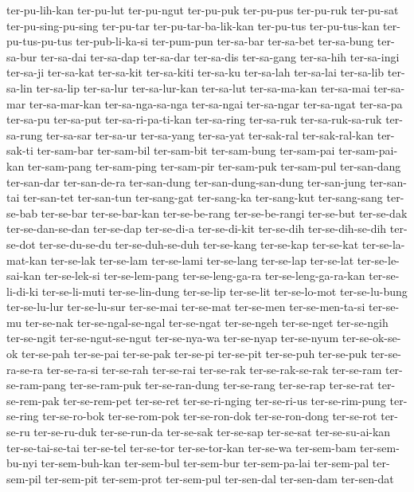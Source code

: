 {ter-pu-lih-kan ter-pu-lut ter-pu-ngut ter-pu-puk ter-pu-pus ter-pu-ruk
ter-pu-sat ter-pu-sing-pu-sing ter-pu-tar ter-pu-tar-ba-lik-kan ter-pu-tus
ter-pu-tus-kan ter-pu-tus-pu-tus ter-pub-li-ka-si ter-pum-pun ter-sa-bar
ter-sa-bet ter-sa-bung ter-sa-bur ter-sa-dai ter-sa-dap ter-sa-dar
ter-sa-dis ter-sa-gang ter-sa-hih ter-sa-ingi ter-sa-ji ter-sa-kat
ter-sa-kit ter-sa-kiti ter-sa-ku ter-sa-lah ter-sa-lai ter-sa-lib
ter-sa-lin ter-sa-lip ter-sa-lur ter-sa-lur-kan ter-sa-lut ter-sa-ma-kan
ter-sa-mai ter-sa-mar ter-sa-mar-kan ter-sa-nga-sa-nga ter-sa-ngai
ter-sa-ngar ter-sa-ngat ter-sa-pa ter-sa-pu ter-sa-put ter-sa-ri-pa-ti-kan
ter-sa-ring ter-sa-ruk ter-sa-ruk-sa-ruk ter-sa-rung ter-sa-sar ter-sa-ur
ter-sa-yang ter-sa-yat ter-sak-ral ter-sak-ral-kan ter-sak-ti ter-sam-bar
ter-sam-bil ter-sam-bit ter-sam-bung ter-sam-pai ter-sam-pai-kan
ter-sam-pang ter-sam-ping ter-sam-pir ter-sam-puk ter-sam-pul ter-san-dang
ter-san-dar ter-san-de-ra ter-san-dung ter-san-dung-san-dung ter-san-jung
ter-san-tai ter-san-tet ter-san-tun ter-sang-gat ter-sang-ka ter-sang-kut
ter-sang-sang ter-se-bab ter-se-bar ter-se-bar-kan ter-se-be-rang
ter-se-be-rangi ter-se-but ter-se-dak ter-se-dan-se-dan ter-se-dap
ter-se-di-a ter-se-di-kit ter-se-dih ter-se-dih-se-dih ter-se-dot
ter-se-du-se-du ter-se-duh-se-duh ter-se-kang ter-se-kap ter-se-kat
ter-se-la-mat-kan ter-se-lak ter-se-lam ter-se-lami ter-se-lang ter-se-lap
ter-se-lat ter-se-le-sai-kan ter-se-lek-si ter-se-lem-pang
ter-se-leng-ga-ra ter-se-leng-ga-ra-kan ter-se-li-di-ki ter-se-li-muti
ter-se-lin-dung ter-se-lip ter-se-lit ter-se-lo-mot ter-se-lu-bung
ter-se-lu-lur ter-se-lu-sur ter-se-mai ter-se-mat ter-se-men
ter-se-men-ta-si ter-se-mu ter-se-nak ter-se-ngal-se-ngal ter-se-ngat
ter-se-ngeh ter-se-nget ter-se-ngih ter-se-ngit ter-se-ngut-se-ngut
ter-se-nya-wa ter-se-nyap ter-se-nyum ter-se-ok-se-ok ter-se-pah
ter-se-pai ter-se-pak ter-se-pi ter-se-pit ter-se-puh ter-se-puk
ter-se-ra-se-ra ter-se-ra-si ter-se-rah ter-se-rai ter-se-rak
ter-se-rak-se-rak ter-se-ram ter-se-ram-pang ter-se-ram-puk
ter-se-ran-dung ter-se-rang ter-se-rap ter-se-rat ter-se-rem-pak
ter-se-rem-pet ter-se-ret ter-se-ri-nging ter-se-ri-us ter-se-rim-pung
ter-se-ring ter-se-ro-bok ter-se-rom-pok ter-se-ron-dok ter-se-ron-dong
ter-se-rot ter-se-ru ter-se-ru-duk ter-se-run-da ter-se-sak ter-se-sap
ter-se-sat ter-se-su-ai-kan ter-se-tai-se-tai ter-se-tel ter-se-tor
ter-se-tor-kan ter-se-wa ter-sem-bam ter-sem-bu-nyi ter-sem-buh-kan
ter-sem-bul ter-sem-bur ter-sem-pa-lai ter-sem-pal ter-sem-pil ter-sem-pit
ter-sem-prot ter-sem-pul ter-sen-dal ter-sen-dam ter-sen-dat
}
